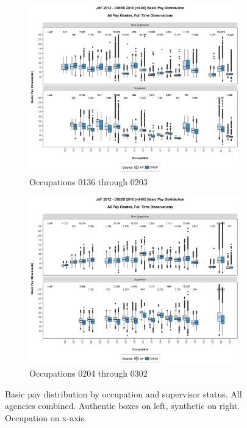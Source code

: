 \documentclass[10pt, letterpaper]{article}
\begin{document}
\begin{spacing}{1.0}
\begin{figure}[h]
    \centering
    \begin{subfigure}{1\textwidth}
        \centering
        \includegraphics[width=6in, trim={0 1in 0 0.75in}, clip]{JdFDIBBSBasicPaySupervisoryStatusOccupation41.png}
        \caption{Occupations 0136 through 0203}
        \vspace{10pt}
    \end{subfigure}
    \begin{subfigure}{1\textwidth}
        \centering
        \includegraphics[width=6in, trim={0 1in 0 0.75in}, clip]{JdFDIBBSBasicPaySupervisoryStatusOccupation61.png}
        \caption{Occupations 0204 through 0302}
        \vspace{10pt}
    \end{subfigure}
    \caption{Basic pay distribution by occupation and supervisor status.  All agencies combined.  Authentic boxes on left, synthetic on right.  Occupation on x-axis.}
    \label{figure:JdFDIBBSBasicPaySupervisoryStatusOccupation2}
\end{figure}


\end{spacing}
\end{document}

